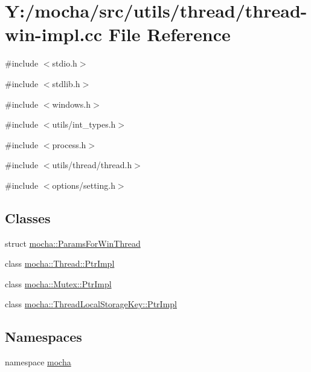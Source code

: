 \hypertarget{thread-win-impl_8cc}{
\section{Y:/mocha/src/utils/thread/thread-\/win-\/impl.cc File Reference}
\label{thread-win-impl_8cc}
}
{\ttfamily \#include $<$stdio.h$>$}\par
{\ttfamily \#include $<$stdlib.h$>$}\par
{\ttfamily \#include $<$windows.h$>$}\par
{\ttfamily \#include $<$utils/int\_\-types.h$>$}\par
{\ttfamily \#include $<$process.h$>$}\par
{\ttfamily \#include $<$utils/thread/thread.h$>$}\par
{\ttfamily \#include $<$options/setting.h$>$}\par
\subsection*{Classes}
\begin{DoxyCompactItemize}
\item 
struct \hyperlink{structmocha_1_1_params_for_win_thread}{mocha::ParamsForWinThread}
\item 
class \hyperlink{classmocha_1_1_thread_1_1_ptr_impl}{mocha::Thread::PtrImpl}
\item 
class \hyperlink{classmocha_1_1_mutex_1_1_ptr_impl}{mocha::Mutex::PtrImpl}
\item 
class \hyperlink{classmocha_1_1_thread_local_storage_key_1_1_ptr_impl}{mocha::ThreadLocalStorageKey::PtrImpl}
\end{DoxyCompactItemize}
\subsection*{Namespaces}
\begin{DoxyCompactItemize}
\item 
namespace \hyperlink{namespacemocha}{mocha}
\end{DoxyCompactItemize}
